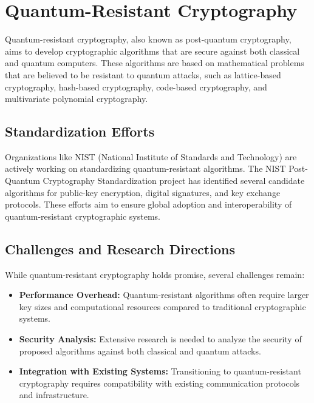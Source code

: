 \documentclass[12pt,a4paper]{report}
\begin{document}
\section{Quantum-Resistant Cryptography}
Quantum-resistant cryptography, also known as post-quantum cryptography, aims to develop cryptographic algorithms that are secure against both classical and quantum computers. These algorithms are based on mathematical problems that are believed to be resistant to quantum attacks, such as lattice-based cryptography, hash-based cryptography, code-based cryptography, and multivariate polynomial cryptography.

\subsection{Standardization Efforts}
Organizations like NIST (National Institute of Standards and Technology) are actively working on standardizing quantum-resistant algorithms. The NIST Post-Quantum Cryptography Standardization project has identified several candidate algorithms for public-key encryption, digital signatures, and key exchange protocols. These efforts aim to ensure global adoption and interoperability of quantum-resistant cryptographic systems.

\subsection{Challenges and Research Directions}
While quantum-resistant cryptography holds promise, several challenges remain:
\begin{itemize}
    \item \textbf{Performance Overhead:} Quantum-resistant algorithms often require larger key sizes and computational resources compared to traditional cryptographic systems.
    \item \textbf{Security Analysis:} Extensive research is needed to analyze the security of proposed algorithms against both classical and quantum attacks.
    \item \textbf{Integration with Existing Systems:} Transitioning to quantum-resistant cryptography requires compatibility with existing communication protocols and infrastructure.
\end{itemize}
\end{document}
